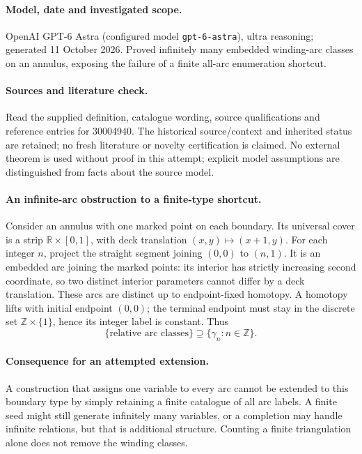 \documentclass[11pt]{article}
\begin{document}
\paragraph{Model, date and investigated scope.}
OpenAI GPT-6 Astra (configured model \texttt{gpt-6-astra}), ultra reasoning; generated 11 October 2026. Proved infinitely many embedded winding-arc classes on an annulus, exposing the failure of a finite all-arc enumeration shortcut.

\paragraph{Sources and literature check.}
Read the supplied definition, catalogue wording, source qualifications and reference entries for 30004940. The historical source/context and inherited status are retained; no fresh literature or novelty certification is claimed. No external theorem is used without proof in this attempt; explicit model assumptions are distinguished from facts about the source model.

\paragraph{An infinite-arc obstruction to a finite-type shortcut.} Consider an annulus with one marked point on each boundary. Its universal cover is a strip \(\mathbb R\times[0,1]\), with deck translation \((x,y)\mapsto(x+1,y)\). For each integer \(n\), project the straight segment joining \((0,0)\) to \((n,1)\). It is an embedded arc joining the marked points: its interior has strictly increasing second coordinate, so two distinct interior parameters cannot differ by a deck translation.
These arcs are distinct up to endpoint-fixed homotopy. A homotopy lifts with initial endpoint \((0,0)\); the terminal endpoint must stay in the discrete set \(\mathbb Z\times\{1\}\), hence its integer label is constant. Thus
\[
 \{\text{relative arc classes}\}\supseteq\{\gamma_n:n\in\mathbb Z\}.
\]
\paragraph{Consequence for an attempted extension.} A construction that assigns one variable to every arc cannot be extended to this boundary type by simply retaining a finite catalogue of all arc labels. A finite seed might still generate infinitely many variables, or a completion may handle infinite relations, but that is additional structure. Counting a finite triangulation alone does not remove the winding classes.
\end{document}
